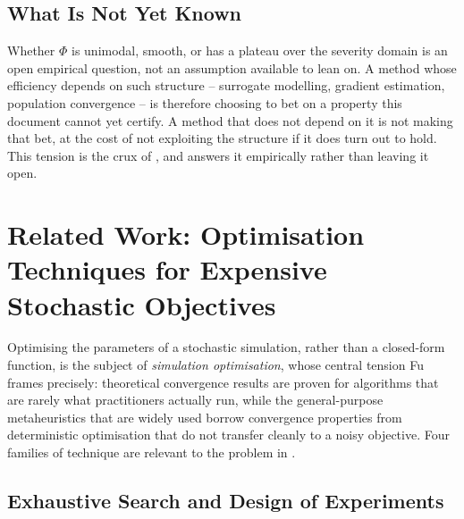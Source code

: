 \subsection{What Is Not Yet Known}

Whether $\Phi$ is unimodal, smooth, or has a plateau over the severity domain
is an open empirical question, not an assumption available to lean on. A
method whose efficiency depends on such structure -- surrogate modelling,
gradient estimation, population convergence -- is therefore choosing to bet on
a property this document cannot yet certify. A method that does not depend on
it is not making that bet, at the cost of not exploiting the structure if it
does turn out to hold. This tension is the crux of , and
 answers it empirically rather than leaving it open.

\section{Related Work: Optimisation Techniques for Expensive Stochastic Objectives}
\label{sec:related-work}

Optimising the parameters of a stochastic simulation, rather than a
closed-form function, is the subject of \emph{simulation optimisation}, whose
central tension Fu~\cite{fu2002optimization} frames precisely: theoretical
convergence results are proven for algorithms that are rarely what
practitioners actually run, while the general-purpose metaheuristics that are
widely used borrow convergence properties from deterministic optimisation that
do not transfer cleanly to a noisy objective. Four families of technique are
relevant to the problem in .

\subsection{Exhaustive Search and Design of Experiments}

